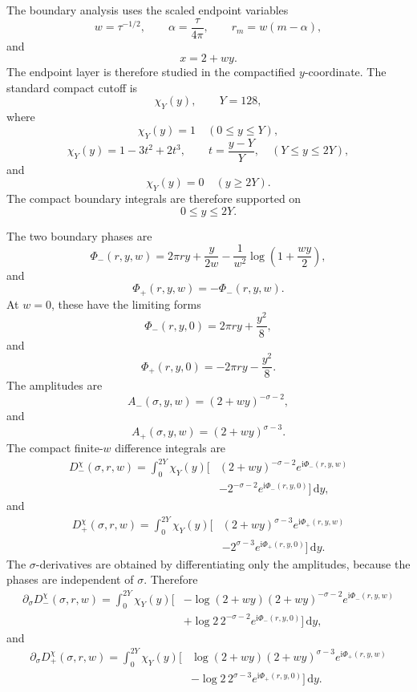 \documentclass[11pt]{article}
\newcommand{\ii}{\mathrm{i}}
\newcommand{\dd}{\mathrm{d}}
\newcommand{\sig}{\sigma}
\newcommand{\tauh}{\tau}
\begin{document}
The boundary analysis uses the scaled endpoint variables
\[
        w=\tauh^{-1/2},
        \qquad
        \alpha=\frac{\tauh}{4\pi},
        \qquad
        r_m=w(m-\alpha),
\]
and
\[
        x=2+wy.
\]
The endpoint layer is therefore studied in the compactified \(y\)-coordinate.
The standard compact cutoff is
\[
        \chi_Y(y),
        \qquad
        Y=128,
\]
where
\[
        \chi_Y(y)=1
        \quad
        (0\le y\le Y),
\]
\[
        \chi_Y(y)=1-3t^2+2t^3,
        \qquad
        t=\frac{y-Y}{Y},
        \quad
        (Y\le y\le 2Y),
\]
and
\[
        \chi_Y(y)=0
        \quad
        (y\ge2Y).
\]
The compact boundary integrals are therefore supported on
\[
        0\le y\le2Y.
\]

The two boundary phases are
\[
        \Phi_-(r,y,w)
        =
        2\pi r y
        +
        \frac{y}{2w}
        -
        \frac{1}{w^2}
        \log\left(1+\frac{wy}{2}\right),
\]
and
\[
        \Phi_+(r,y,w)
        =
        -\Phi_-(r,y,w).
\]
At \(w=0\), these have the limiting forms
\[
        \Phi_-(r,y,0)
        =
        2\pi r y+\frac{y^2}{8},
\]
and
\[
        \Phi_+(r,y,0)
        =
        -2\pi r y-\frac{y^2}{8}.
\]
The amplitudes are
\[
        A_-(\sig,y,w)
        =
        (2+wy)^{-\sig-2},
\]
and
\[
        A_+(\sig,y,w)
        =
        (2+wy)^{\sig-3}.
\]
The compact finite-\(w\) difference integrals are
\[
\begin{aligned}
        D_-^\chi(\sig,r,w)
        =
        \int_0^{2Y}
        \chi_Y(y)
        \bigg[
            &(2+wy)^{-\sig-2}
            e^{\ii\Phi_-(r,y,w)}
            \\
            &-
            2^{-\sig-2}
            e^{\ii\Phi_-(r,y,0)}
        \bigg]
        \,\dd y,
\end{aligned}
\]
and
\[
\begin{aligned}
        D_+^\chi(\sig,r,w)
        =
        \int_0^{2Y}
        \chi_Y(y)
        \bigg[
            &(2+wy)^{\sig-3}
            e^{\ii\Phi_+(r,y,w)}
            \\
            &-
            2^{\sig-3}
            e^{\ii\Phi_+(r,y,0)}
        \bigg]
        \,\dd y.
\end{aligned}
\]
The \(\sig\)-derivatives are obtained by differentiating only the amplitudes,
because the phases are independent of \(\sig\).  Therefore
\[
\begin{aligned}
        \partial_\sig D_-^\chi(\sig,r,w)
        =
        \int_0^{2Y}
        \chi_Y(y)
        \bigg[
            &-\log(2+wy)(2+wy)^{-\sig-2}
            e^{\ii\Phi_-(r,y,w)}
            \\
            &+
            \log2\,2^{-\sig-2}
            e^{\ii\Phi_-(r,y,0)}
        \bigg]
        \,\dd y,
\end{aligned}
\]
and
\[
\begin{aligned}
        \partial_\sig D_+^\chi(\sig,r,w)
        =
        \int_0^{2Y}
        \chi_Y(y)
        \bigg[
            &\log(2+wy)(2+wy)^{\sig-3}
            e^{\ii\Phi_+(r,y,w)}
            \\
            &-
            \log2\,2^{\sig-3}
            e^{\ii\Phi_+(r,y,0)}
        \bigg]
        \,\dd y.
\end{aligned}
\]
\end{document}
